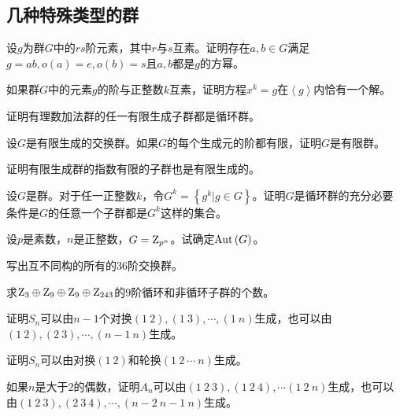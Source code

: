 \subsection{几种特殊类型的群}
\begin{prob}
设$g$为群$G$中的$rs$阶元素，其中$r$与$s$互素。证明存在$a,b\in G$满足$g=ab,o\left(a\right)=e,o\left(b\right)=s$且$a,b$都是$g$的方幂。
\end{prob}
\begin{prob}
如果群$G$中的元素$g$的阶与正整数$k$互素，证明方程$x^{k}=g$在$\left\langle g \right\rangle $内恰有一个解。
\end{prob}
\begin{prob}
证明有理数加法群的任一有限生成子群都是循环群。
\end{prob}
\begin{prob}
设$G$是有限生成的交换群。如果$G$的每个生成元的阶都有限，证明$G$是有限群。
\end{prob}
\begin{probx}
证明有限生成群的指数有限的子群也是有限生成的。
\end{probx}
\begin{probx}
设$G$是群。对于任一正整数$k$，令$G^{k}=\left\{g^{k}\vert g\in G \right\}$。证明$G$是循环群的充分必要条件是$G$的任意一个子群都是$G^{k}$这样的集合。
\end{probx}
\begin{probx}
设$p$是素数，$n$是正整数，$G={\rm Z}_{p^{n}}$。试确定${\rm Aut}\left(G\right)$。
\end{probx}
\begin{prob}
写出互不同构的所有的$36$阶交换群。
\end{prob}
\begin{prob}
求${\rm Z}_3\oplus {\rm Z}_{9}\oplus {\rm Z}_{9}\oplus {\rm Z_{243}}$的$9$阶循环和非循环子群的个数。
\end{prob}
\begin{prob}
证明$S_{n}$可以由$n-1$个对换$\left(1\ 2\right),\left(1\ 3\right),\cdots ,\left(1\ n\right)$生成，也可以由$\left(1\ 2\right),\left(2\ 3\right),\cdots ,\left(n-1\ n\right)$生成。
\end{prob}
\begin{prob}
证明$S_{n}$可以由对换$\left(1\ 2\right)$和轮换$\left(1\ 2\ \cdots \ n\right)$生成。
\end{prob}
\begin{prob}
如果$n$是大于$2$的偶数，证明$A_{n}$可以由$\left(1\ 2\ 3\right),\left(1\ 2\ 4\right),\cdots \left(1\ 2\ n\right)$生成，也可以由$\left(1\ 2\ 3\right),\left(2\ 3\ 4\right),\cdots ,\left(n-2\ n-1\ n\right)$生成。
\end{prob}

